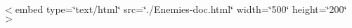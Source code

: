 $<$embed type=\char`\"{}text/html\char`\"{} src=\char`\"{}./\+Enemies-\/doc.\+html\char`\"{} width=\char`\"{}500\char`\"{} height=\char`\"{}200\char`\"{}$>$ 